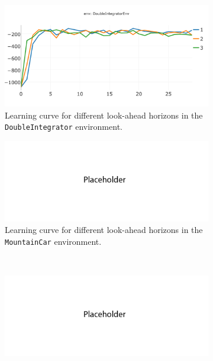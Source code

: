 \documentclass{article}
\begin{document}
\begin{figure}[h!]
    \centering
    \begin{subfigure}{0.45\textwidth}
        \centering
        \includegraphics[width=\textwidth]{figures/part_2_d_a.png}
        \caption{Learning curve for different look-ahead horizons in the \texttt{DoubleIntegrator} environment.}
    \end{subfigure}
    \hspace{0.2 in}
    \begin{subfigure}{0.45\textwidth}
        \centering
        \includegraphics[width=\textwidth]{figures/placeholder_2.png}
        \caption{Learning curve for different look-ahead horizons in the \texttt{MountainCar} environment.}
    \end{subfigure}
\\
    \centering
    \begin{subfigure}{0.45\textwidth}
        \centering
        \includegraphics[width=\textwidth]{figures/placeholder_2.png}

\end{subfigure}
\end{figure}
\end{document}
